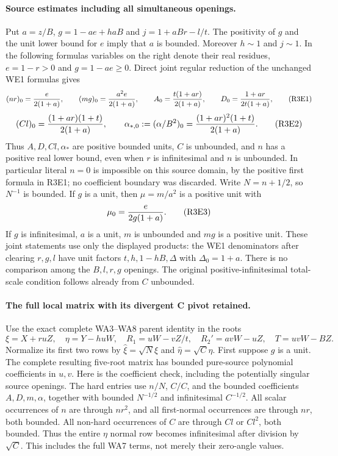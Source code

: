 \paragraph{Source estimates including all simultaneous openings.}
Put $a=z/B$, $g=1-ae+haB$ and $j=1+aBr-l/t$. The positivity
of $g$ and the unit lower bound for $e$ imply that $a$ is bounded.
Moreover $h\sim1$ and $j\sim1$. In the following formulas variables
on the right denote their real residues, $e=1-r>0$ and
$g=1-ae\ge0$. Direct joint regular reduction of the unchanged WE1
formulas gives
\[
 (nr)_0={e\over2(1+a)},\qquad
 (mg)_0={a^2e\over2(1+a)},\qquad
 A_0={t(1+ar)\over2(1+a)},\qquad
 D_0={1+ar\over2t(1+a)},                         \tag{R3E1}
\]
\[
 (Cl)_0={(1+ar)(1+t)\over2(1+a)},\qquad
 \alpha_{*,0}:=(\alpha/B^2)_0
       ={(1+ar)^2(1+t)\over2(1+a)}.              \tag{R3E2}
\]
Thus $A,D,Cl,\alpha_*$ are positive bounded units, $C$ is unbounded,
and $n$ has a positive real lower bound, even when $r$ is
infinitesimal and $n$ is unbounded. In particular literal $n=0$
is impossible on this source domain, by the positive first formula
in R3E1; no coefficient boundary was discarded. Write
$N=n+1/2$, so $N^{-1}$ is bounded. If $g$ is a unit, then
$\mu=m/a^2$ is a positive unit with
\[
              \mu_0={e\over2g(1+a)}.             \tag{R3E3}
\]
If $g$ is infinitesimal, $a$ is a unit, $m$ is unbounded and $mg$
is a positive unit. These joint statements use only the displayed
products: the WE1 denominators after clearing $r,g,l$ have unit
factors $t,h,1-hB,\Delta$ with $\Delta_0=1+a$.
There is no comparison among the $B,l,r,g$ openings. The original
positive-infinitesimal total-scale condition follows already from
$C$ unbounded.

\paragraph{The full local matrix with its divergent C pivot retained.}
Use the exact complete WA3--WA8 parent identity in the roots
\[
 \xi=X+ruZ,\quad \eta=Y-huW,\quad
 R_1=uW-vZ/t,\quad R_2'=avW-uZ,\quad T=uvW-BZ.
\]
Normalize its first two rows by
$\widehat\xi=\sqrt N\xi$ and $\widehat\eta=\sqrt C\eta$.
First suppose $g$ is a unit. The complete resulting five-root
matrix has bounded pure-source polynomial coefficients in $u,v$.
Here is the coefficient check, including the potentially singular
source openings. The hard entries use $n/N$, $C/C$, and the bounded
coefficients $A,D,m,\alpha$, together with bounded $N^{-1/2}$ and
infinitesimal $C^{-1/2}$. All scalar occurrences of $n$ are through
$nr^2$, and all first-normal occurrences are through $nr$, both
bounded. All non-hard occurrences of $C$ are through $Cl$ or
$Cl^2$, both bounded. Thus the entire $\eta$ normal row becomes
infinitesimal after division by $\sqrt C$. This includes the full
WA7 terms, not merely their zero-angle values.

